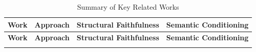 \begin{longtable}[htpb]{|>{\raggedright\arraybackslash}p{3.5cm}|>{\raggedright\arraybackslash}p{4cm}|>{\raggedright\arraybackslash}p{3cm}|>{\raggedright\arraybackslash}p{3cm}|}
  \caption[Summary of Key Related Works]{Summary of Key Related Works} \label{tab:related_summary}                                                   \\
  \hline
  \textbf{Work}                               & \textbf{Approach}                & \textbf{Structural Faithfulness} & \textbf{Semantic Conditioning} \\
  \hline
  \endfirsthead

  \hline
  \textbf{Work}                               & \textbf{Approach}                & \textbf{Structural Faithfulness} & \textbf{Semantic Conditioning} \\
  \hline
  \endhead

  \hline
  \endfoot

  \hline
  \endlastfoot


\end{longtable}
